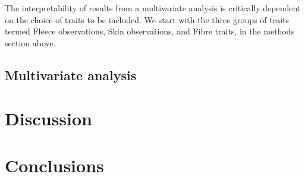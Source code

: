 \documentclass[titlepage]{article}  %
\begin{document}
The interpretability of results from a multivariate analysis is critically dependent on the choice of traits to be included. We start with the three groups of traits termed Fleece observations, Skin observations, and Fibre traits, in the methods section above.

\subsection{Multivariate analysis}


\section{Discussion}

\section{Conclusions}
\end{document}
